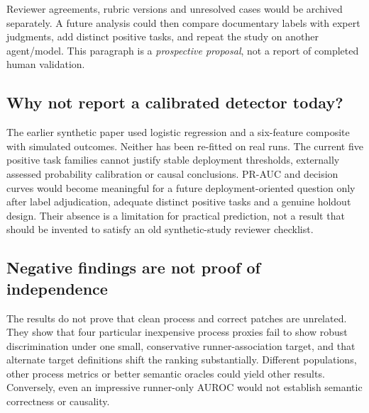 Reviewer agreements, rubric versions and unresolved cases would be archived separately. A future analysis could then compare documentary labels with expert judgments, add distinct positive tasks, and repeat the study on another agent/model. This paragraph is a \emph{prospective proposal}, not a report of completed human validation.

\subsection{Why not report a calibrated detector today?}
The earlier synthetic paper used logistic regression and a six-feature composite with simulated outcomes. Neither has been re-fitted on real runs. The current five positive task families cannot justify stable deployment thresholds, externally assessed probability calibration or causal conclusions. PR-AUC and decision curves would become meaningful for a future deployment-oriented question only after label adjudication, adequate distinct positive tasks and a genuine holdout design. Their absence is a limitation for practical prediction, not a result that should be invented to satisfy an old synthetic-study reviewer checklist.

\subsection{Negative findings are not proof of independence}
The results do not prove that clean process and correct patches are unrelated. They show that four particular inexpensive process proxies fail to show robust discrimination under one small, conservative runner-association target, and that alternate target definitions shift the ranking substantially. Different populations, other process metrics or better semantic oracles could yield other results. Conversely, even an impressive runner-only AUROC would not establish semantic correctness or causality.
